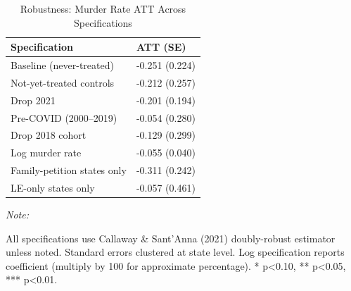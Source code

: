 \begin{table}[!h]
\centering
\caption{\label{tab:tab:robustness}Robustness: Murder Rate ATT Across Specifications}
\centering
\begin{threeparttable}
\begin{tabular}[t]{ll}
\toprule
Specification & ATT (SE)\\
\midrule
Baseline (never-treated) & -0.251 (0.224)\\
Not-yet-treated controls & -0.212 (0.257)\\
Drop 2021 & -0.201 (0.194)\\
Pre-COVID (2000--2019) & -0.054 (0.280)\\
Drop 2018 cohort & -0.129 (0.299)\\
\addlinespace
Log murder rate & -0.055 (0.040)\\
Family-petition states only & -0.311 (0.242)\\
LE-only states only & -0.057 (0.461)\\
\bottomrule
\end{tabular}
\begin{tablenotes}
\item \textit{Note: } 
\item All specifications use Callaway & Sant'Anna (2021) doubly-robust estimator unless noted. Standard errors clustered at state level. Log specification reports coefficient (multiply by 100 for approximate percentage). * p<0.10, ** p<0.05, *** p<0.01.
\end{tablenotes}
\end{threeparttable}
\end{table}
